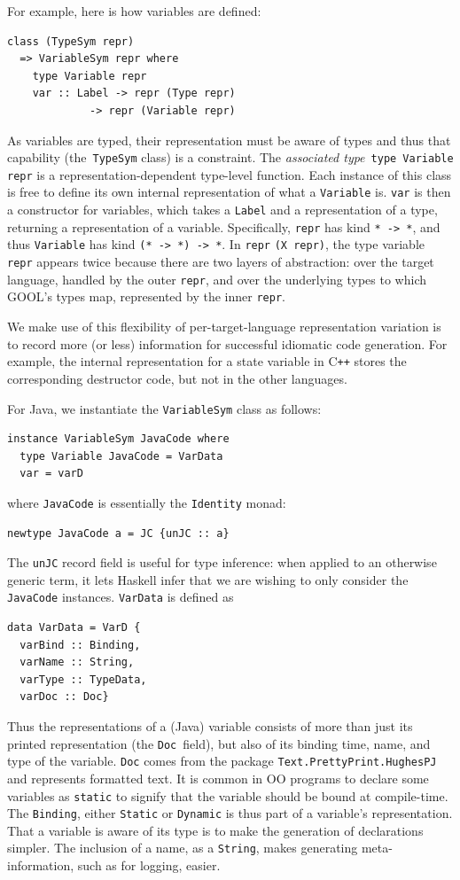 \documentclass[sigplan,review,anonymous,prologue,dvipsnames]{acmart}
\newcommand{\Cplusplus}{C\texttt{++}}
\begin{document}
For example, here is how variables are defined:
\begin{lstlisting}
class (TypeSym repr)
  => VariableSym repr where
    type Variable repr
    var :: Label -> repr (Type repr)
             -> repr (Variable repr)
\end{lstlisting}
As variables are typed, their representation must be aware of types and
thus that capability (the~\verb|TypeSym| class) is a constraint.  The
\emph{associated type}~\verb|type Variable repr| is a representation-dependent
type-level function.  Each instance of this
class is free to define its own internal representation of what a
\verb|Variable| is. \verb|var| is then a constructor for variables,
which takes a \verb|Label| and a representation of a type, returning
a representation of a variable.  Specifically, \verb|repr| has kind
\verb|* -> *|, and thus \verb|Variable| has kind \verb|(* -> *) -> *|.
In \verb|repr| \verb|(X repr)|, the type variable \verb|repr| appears
twice because there are two layers of abstraction: over the target
language, handled by the outer \verb|repr|, and over the underlying
types to which GOOL's types map, represented by the inner \verb|repr|.

We make use of this flexibility of per-target-language representation
variation is to record more (or less) information for
successful idiomatic code generation. For example, the internal representation for a 
state variable in \Cplusplus{} stores the corresponding destructor code,
but not in the other languages.

For Java, we instantiate the \verb|VariableSym| class as follows:
\begin{lstlisting}
instance VariableSym JavaCode where
  type Variable JavaCode = VarData
  var = varD
\end{lstlisting}
where \verb|JavaCode| is essentially the \verb|Identity| monad:
\begin{lstlisting}
newtype JavaCode a = JC {unJC :: a}
\end{lstlisting}
The \verb|unJC| record field is useful for type inference: when applied to
an otherwise generic term, it lets Haskell infer that we are wishing
to only consider the \verb|JavaCode| instances.  \verb|VarData| is defined as
\begin{lstlisting}
data VarData = VarD {
  varBind :: Binding,
  varName :: String,
  varType :: TypeData,
  varDoc :: Doc}
\end{lstlisting}
Thus the representations of a (Java) variable consists of more than just its
printed representation (the \verb|Doc|~field), but also of its binding time,
name, and type of the variable. \verb|Doc| comes from the package 
\verb|Text.PrettyPrint.HughesPJ| and represents formatted text. It is common in 
OO programs to declare some variables as \verb|static| to signify that the 
variable should be bound at compile-time. The \verb|Binding|, either 
\verb|Static| or \verb|Dynamic| is thus part of a variable's representation.
That a variable is aware of its type is to make the generation of declarations
simpler. The inclusion of a name, as a \verb|String|, makes generating
meta-information, such as for logging, easier.
\end{document}
